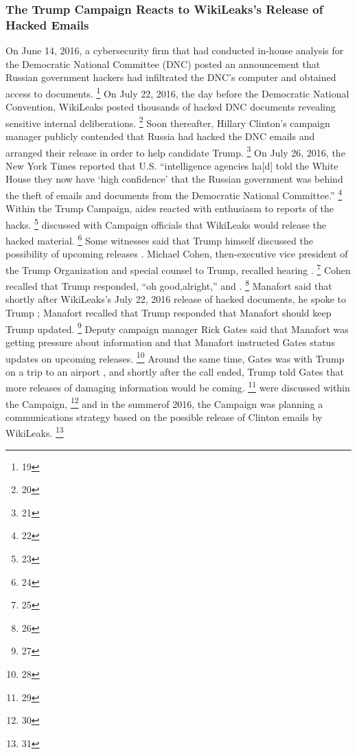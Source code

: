 \subsubsection{The Trump Campaign Reacts to WikiLeaks's Release of Hacked Emails}
On June 14, 2016, a cybersecurity firm that had conducted in-house analysis for the Democratic National Committee (DNC) posted an announcement that Russian government hackers had infiltrated the DNC's computer and obtained access to documents.%
\footnote{19}
On July 22, 2016, the day before the Democratic National Convention, WikiLeaks posted thousands of hacked DNC documents revealing sensitive internal deliberations.%
\footnote{20}
Soon thereafter, Hillary Clinton's campaign manager publicly contended that Russia had hacked the DNC emails and arranged their release in order to help candidate Trump.%
\footnote{21}
On July 26, 2016, the New York Times reported that U.S. ``intelligence agencies ha[d] told the White House they now have `high confidence' that the Russian government was behind the theft of emails and documents from the Democratic National Committee.''%
\footnote{22}
Within the Trump Campaign, aides reacted with enthusiasm to reports of the hacks.%
\footnote{23}
 discussed with Campaign officials that WikiLeaks would release the hacked material.%
\footnote{24}
Some witnesses said that Trump himself discussed the possibility of upcoming releases . 
Michael Cohen, then-executive vice president of the Trump Organization and special counsel to Trump, recalled hearing .%
\footnote{25}
Cohen recalled that Trump responded, ``oh good,alright,'' and .%
\footnote{26}
Manafort said that shortly after WikiLeaks's July 22, 2016 release of hacked documents, he spoke to Trump ; Manafort recalled that Trump responded that Manafort should  keep Trump updated.%
\footnote{27}
Deputy campaign manager Rick Gates said that Manafort was getting pressure about  information and that Manafort instructed Gates  status updates on upcoming releases.%
\footnote{28}
Around the same time, Gates was with Trump on a trip to an airport , and shortly after the call ended, Trump told Gates that more releases of damaging information would be coming.%
\footnote{29}
 were discussed within the Campaign,%
\footnote{30}
and in the summerof 2016, the Campaign was planning a communications strategy based on the possible release of Clinton emails by WikiLeaks.%
\footnote{31}

